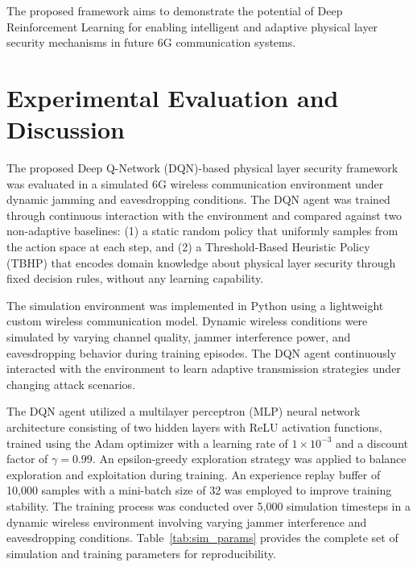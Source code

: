 \documentclass[conference]{IEEEtran}
\begin{document}
The proposed framework aims to demonstrate the potential of Deep Reinforcement Learning for enabling intelligent and adaptive physical layer security mechanisms in future 6G communication systems.

\section{Experimental Evaluation and Discussion}

The proposed Deep Q-Network (DQN)-based physical layer security framework was evaluated in a simulated 6G wireless communication environment under dynamic jamming and eavesdropping conditions. The DQN agent was trained through continuous interaction with the environment and compared against two non-adaptive baselines: (1) a static random policy that uniformly samples from the action space at each step, and (2) a Threshold-Based Heuristic Policy (TBHP) that encodes domain knowledge about physical layer security through fixed decision rules, without any learning capability.

The simulation environment was implemented in Python using a lightweight custom wireless communication model. Dynamic wireless conditions were simulated by varying channel quality, jammer interference power, and eavesdropping behavior during training episodes. The DQN agent continuously interacted with the environment to learn adaptive transmission strategies under changing attack scenarios.

The DQN agent utilized a multilayer perceptron (MLP) neural network architecture consisting of two hidden layers with ReLU activation functions, trained using the Adam optimizer with a learning rate of $1\times10^{-3}$ and a discount factor of $\gamma = 0.99$. An epsilon-greedy exploration strategy was applied to balance exploration and exploitation during training. An experience replay buffer of 10,000 samples with a mini-batch size of 32 was employed to improve training stability. The training process was conducted over 5,000 simulation timesteps in a dynamic wireless environment involving varying jammer interference and eavesdropping conditions. Table~\ref{tab:sim_params} provides the complete set of simulation and training parameters for reproducibility.
\end{document}
